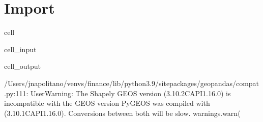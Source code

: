 \documentclass[letterpaper,10pt,english]{jupyterBook}
\begin{document}
\section{Import}
\label{\detokenize{notebooks/data_exploration:import}}
\begin{sphinxuseclass}{cell}\begin{sphinxVerbatimInput}

\begin{sphinxuseclass}{cell_input}
\begin{sphinxVerbatim}[commandchars=\\\{\}]
   
   
   
 
   
     
   
   
   
   
\end{sphinxVerbatim}

\end{sphinxuseclass}\end{sphinxVerbatimInput}
\begin{sphinxVerbatimOutput}

\begin{sphinxuseclass}{cell_output}
\begin{sphinxVerbatim}[commandchars=\\\{\}]
/Users/jnapolitano/venvs/finance/lib/python3.9/site\PYGZhy{}packages/geopandas/\PYGZus{}compat.py:111: UserWarning: The Shapely GEOS version (3.10.2\PYGZhy{}CAPI\PYGZhy{}1.16.0) is incompatible with the GEOS version PyGEOS was compiled with (3.10.1\PYGZhy{}CAPI\PYGZhy{}1.16.0). Conversions between both will be slow.
  warnings.warn(
\end{sphinxVerbatim}

\end{sphinxuseclass}\end{sphinxVerbatimOutput}

\end{sphinxuseclass}
\end{document}
